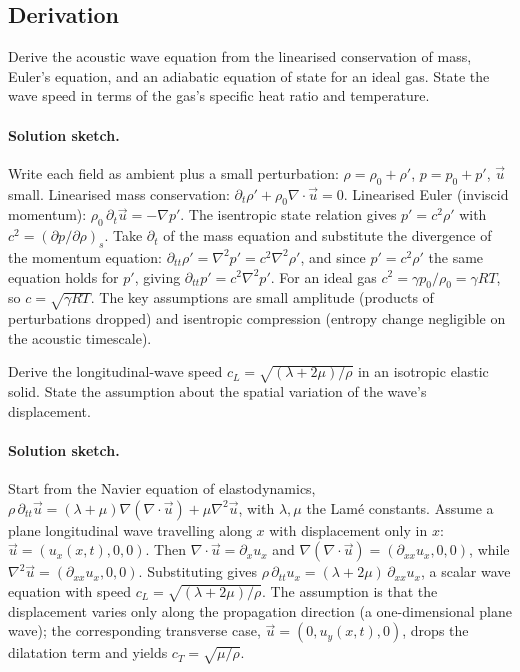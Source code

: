 \subsection*{Derivation}

\begin{exercise}
Derive the acoustic wave equation from the linearised conservation
of mass, Euler's equation, and an adiabatic equation of state for an
ideal gas. State the wave speed in terms of the gas's specific
heat ratio and temperature.
\paragraph{Solution sketch.} Write each field as ambient plus a small
perturbation: $\rho = \rho_0 + \rho'$, $p = p_0 + p'$, $\vec{u}$ small.
Linearised mass conservation:
$\partial_t \rho' + \rho_0\nabla\cdot\vec{u} = 0$. Linearised Euler
(inviscid momentum): $\rho_0\,\partial_t\vec{u} = -\nabla p'$. The
isentropic state relation gives $p' = c^2\rho'$ with
$c^2 = (\partial p/\partial\rho)_s$. Take $\partial_t$ of the mass
equation and substitute the divergence of the momentum equation:
$\partial_{tt}\rho' = \nabla^2 p' = c^2\nabla^2\rho'$, and since
$p' = c^2\rho'$ the same equation holds for $p'$, giving
$\partial_{tt}p' = c^2\nabla^2 p'$. For an ideal gas
$c^2 = \gamma p_0/\rho_0 = \gamma R T$, so $c = \sqrt{\gamma R T}$. The
key assumptions are small amplitude (products of perturbations
dropped) and isentropic compression (entropy change negligible on the
acoustic timescale).
\end{exercise}

\begin{exercise}
Derive the longitudinal-wave speed $c_L = \sqrt{(\lambda + 2\mu)/
\rho}$ in an isotropic elastic solid. State the assumption about
the spatial variation of the wave's displacement.
\paragraph{Solution sketch.} Start from the Navier equation of
elastodynamics,
$\rho\,\partial_{tt}\vec{u} = (\lambda+\mu)\nabla(\nabla\cdot\vec{u})
+ \mu\nabla^2\vec{u}$, with $\lambda,\mu$ the Lam\'e constants. Assume a
plane longitudinal wave travelling along $x$ with displacement only in
$x$: $\vec{u} = (u_x(x,t),0,0)$. Then $\nabla\cdot\vec{u} =
\partial_x u_x$ and $\nabla(\nabla\cdot\vec{u}) =
(\partial_{xx}u_x,0,0)$, while $\nabla^2\vec{u} =
(\partial_{xx}u_x,0,0)$. Substituting gives
$\rho\,\partial_{tt}u_x = (\lambda+2\mu)\,\partial_{xx}u_x$, a scalar
wave equation with speed $c_L = \sqrt{(\lambda+2\mu)/\rho}$. The
assumption is that the displacement varies only along the propagation
direction (a one-dimensional plane wave); the corresponding transverse
case, $\vec{u}=(0,u_y(x,t),0)$, drops the dilatation term and yields
$c_T = \sqrt{\mu/\rho}$.
\end{exercise}

